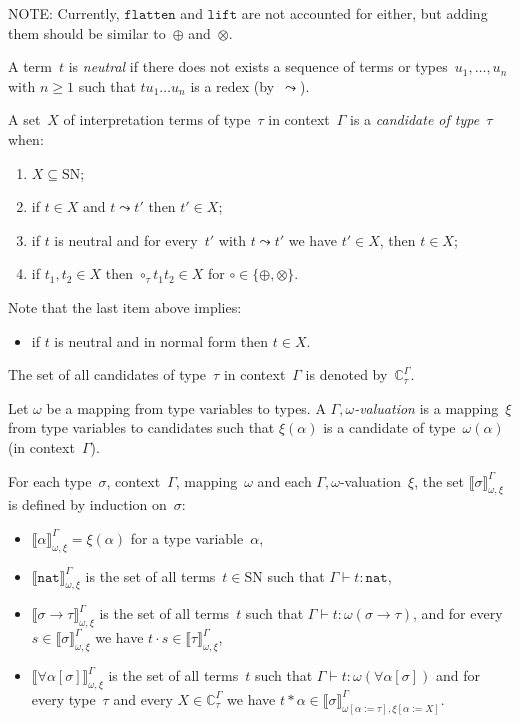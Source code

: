 \documentclass[runningheads,a4paper]{llncs}
\newcommand{\app}[2]{#1 \cdot #2}
\newcommand{\tapp}[2]{#1 * #2}
\newcommand{\subst}[2]{#1:=#2}
\newcommand{\nat}{\mathtt{nat}}
\newcommand{\flatten}{\mathtt{flatten}}
\newcommand{\lift}{\mathtt{lift}}
\newcommand{\SN}{\mathrm{SN}}
\newcommand{\Cb}{\mathbb{C}}
\newcommand{\val}[3]{\ensuremath{\llbracket#1\rrbracket_{#2}^{#3}}}
\newcommand{\proves}{\vdash}
\begin{document}
NOTE: Currently, $\flatten$ and $\lift$ are not accounted for either,
but adding them should be similar to~$\oplus$ and~$\otimes$.

\begin{definition}\label{def_candidate}
  A term~$t$ is \emph{neutral} if there does not exists a sequence of
  terms or types~$u_1,\ldots,u_n$ with $n \ge 1$ such that
  $t u_1 \ldots u_n$ is a redex (by~$\leadsto$).

  A set~$X$ of interpretation terms of type~$\tau$ in context~$\Gamma$
  is a \emph{candidate of type~$\tau$} when:
  \begin{enumerate}
  \item $X \subseteq \SN$;
  \item if $t \in X$ and $t \leadsto t'$ then $t' \in X$;
  \item if $t$ is neutral and for every~$t'$ with $t \leadsto t'$ we
    have $t' \in X$, then $t \in X$;
  \item if $t_1,t_2 \in X$ then $\circ_\tau t_1 t_2 \in X$ for $\circ
    \in \{\oplus,\otimes\}$.
  \end{enumerate}
  Note that the last item above implies:
  \begin{itemize}
  \item if $t$ is neutral and in normal form then $t \in X$.
  \end{itemize}
  The set of all candidates of type~$\tau$ in context~$\Gamma$ is
  denoted by~$\Cb_\tau^\Gamma$.
\end{definition}

\begin{definition}\label{def_reducibility_valuation}
  Let $\omega$ be a mapping from type variables to types. A
  \emph{$\Gamma,\omega$-valuation} is a mapping~$\xi$ from type
  variables to candidates such that $\xi(\alpha)$ is a candidate of
  type~$\omega(\alpha)$ (in context~$\Gamma$).

  For each type~$\sigma$, context~$\Gamma$, mapping~$\omega$
  and each $\Gamma,\omega$-valuation~$\xi$, the set $\val{\sigma}{\omega,\xi}{\Gamma}$ is
  defined by induction on~$\sigma$:
  \begin{itemize}
  \item $\val{\alpha}{\omega,\xi}{\Gamma} = \xi(\alpha)$ for a type
    variable~$\alpha$,
  \item $\val{\nat}{\omega,\xi}{\Gamma}$ is the set of all
    terms~$t \in \SN$ such that $\Gamma \proves t : \nat$,
  \item $\val{\sigma \to \tau}{\omega,\xi}{\Gamma}$ is the set of all
    terms~$t$ such that $\Gamma \proves t : \omega(\sigma \to \tau)$,
    and for every~$s \in \val{\sigma}{\omega,\xi}{\Gamma}$ we have
    $\app{t}{s} \in \val{\tau}{\omega,\xi}{\Gamma}$,
  \item $\val{\forall\alpha[\sigma]}{\omega,\xi}{\Gamma}$ is the set
    of all terms~$t$ such that
    $\Gamma \proves t : \omega(\forall\alpha[\sigma])$ and for every
    type~$\tau$ and every $X \in \Cb_\tau^\Gamma$ we have
    $\tapp{t}{\alpha} \in
    \val{\sigma}{\omega[\subst{\alpha}{\tau}],\xi[\subst{\alpha}{X}]}{\Gamma}$.
  \end{itemize}
\end{definition}
\end{document}
